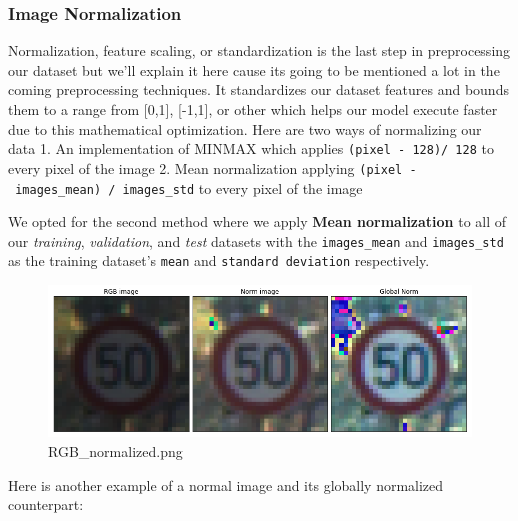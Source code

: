 \documentclass[11pt]{article}
\makeatletter
\def\maxwidth{\ifdim\Gin@nat@width>\linewidth\linewidth
    \else\Gin@nat@width\fi}
\let\Oldincludegraphics\includegraphics
\renewcommand{\includegraphics}[1]{\Oldincludegraphics[width=.8\maxwidth]{#1}}
\makeatother
\begin{document}
    \hypertarget{image-normalization}{%
\subsubsection{Image Normalization}\label{image-normalization}}

Normalization, feature scaling, or standardization is the last step in
preprocessing our dataset but we'll explain it here cause its going to
be mentioned a lot in the coming preprocessing techniques. It
standardizes our dataset features and bounds them to a range from
{[}0,1{]}, {[}-1,1{]}, or other which helps our model execute faster due
to this mathematical optimization. Here are two ways of normalizing our
data 1. An implementation of MINMAX which applies
\texttt{(pixel\ -\ 128)/\ 128} to every pixel of the image 2. Mean
normalization applying \texttt{(pixel\ -\ images\_mean)\ /\ images\_std}
to every pixel of the image

We opted for the second method where we apply \textbf{Mean
normalization} to all of our \emph{training}, \emph{validation}, and
\emph{test} datasets with the \texttt{images\_mean} and
\texttt{images\_std} as the training dataset's \texttt{mean} and
\texttt{standard\ deviation} respectively.

\begin{figure}
\centering
\includegraphics{./assets/RGB_normalized.png}
\caption{RGB\_normalized.png}
\end{figure}

Here is another example of a normal image and its globally normalized
counterpart:
\end{document}
